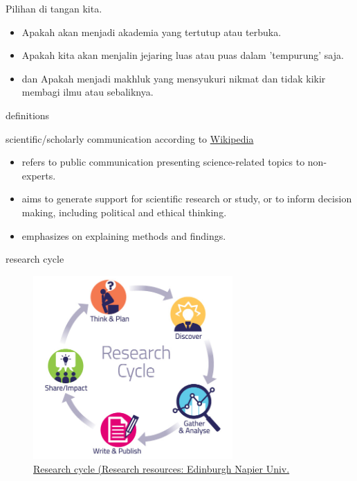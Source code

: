 \documentclass[10pt]{beamer}
\begin{document}
  
\begin{frame}
  	\begin{exampleblock}{Pilihan di tangan kita.}
	\begin{itemize}
	\item Apakah akan menjadi akademia yang tertutup atau terbuka.
    \item Apakah kita akan menjalin jejaring luas atau puas dalam 'tempurung' saja.
    \item dan Apakah menjadi makhluk yang mensyukuri nikmat dan tidak kikir membagi ilmu atau sebaliknya.
	\end{itemize}
  \end{exampleblock}
\end{frame}
  
\begin{frame}{definitions}
    \begin{exampleblock}{scientific/scholarly communication according to \href{https://en.wikipedia.org/wiki/Science_communication}{Wikipedia}}
	\begin{itemize}
    \item refers to public communication presenting science-related topics to non-experts. 
    \item aims to generate support for scientific research or study, or to inform decision making, including political and ethical thinking. 
    \item emphasizes on explaining methods and findings.
    \end{itemize}
    \end{exampleblock}
\end{frame}

\begin{frame}{research cycle}
	\begin{figure}[!ht]
  	\centering
  	\includegraphics[width=3in]{research-cycle.jpg}
    \caption{\href{http://www.uh.edu/~qepsite/discovery/eDISCOVERY_Mentors_FAQs.htm}{Research cycle (Research resources: Edinburgh Napier Univ.}}
	\end{figure}
\end{frame}
  
\end{document}
